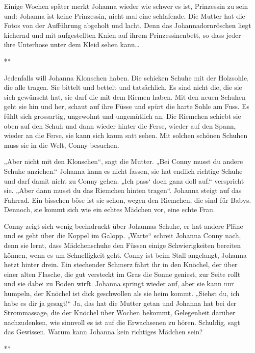 \documentclass[10pt,titlepage,a5paper]{book}
\newcommand{\sterne}{\par{\centering ***\par}}
\begin{document}
Einige Wochen später merkt Johanna wieder wie schwer es ist, Prinzessin zu sein und: Johanna ist keine Prinzessin, nicht mal eine schlafende. Die Mutter hat die Fotos von der Aufführung abgeholt und lacht. Denn das Johannadornröschen liegt kichernd und mit aufgestellten Knien auf ihrem Prinzessinenbett, so dass jeder ihre Unterhose unter dem Kleid sehen kann\dots


\sterne


Jedenfalls will Johanna Klonschen haben. Die schicken Schuhe mit der Holzsohle, die alle tragen. Sie bittelt und bettelt und tatsächlich. Es sind nicht die, die sie sich gewünscht hat, sie darf die mit dem Riemen haben. Mit den neuen Schuhen geht sie hin und her, schaut auf ihre Füsse und spürt die harte Sohle am Fuss. Es fühlt sich grossartig, ungewohnt und ungemütlich an. Die Riemchen schiebt sie oben auf den Schuh und dann wieder hinter die Ferse, wieder auf den Spann, wieder an die Ferse, sie kann sich kaum satt sehen. Mit solchen schönen Schuhen muss sie in die Welt, Conny besuchen.

 „Aber nicht mit den Klonschen“, sagt die Mutter. „Bei Conny musst du andere Schuhe anziehen.“ Johanna kann es nicht fassen, sie hat endlich richtige Schuhe und darf damit nicht zu Conny gehen. „Ich pass` doch ganz doll auf.“ verspricht sie. „Aber dann musst du das Riemchen hinten tragen“. Johanna steigt auf das Fahrrad. Ein bisschen böse ist sie schon, wegen den Riemchen, die sind für Babys.  Dennoch,  sie kommt sich wie ein echtes Mädchen vor, eine echte Frau. 
 
Conny zeigt sich wenig beeindruckt über Johannas Schuhe, er hat andere Pläne und es geht über die Koppel im Galopp. „Warte“ schreit Johanna Conny nach, denn sie lernt, dass  Mädchenschuhe den Füssen einige Schwierigkeiten bereiten können, wenn es um Schnelligkeit geht. Conny ist beim Stall angelangt, Johanna hetzt hinter drein. Ein stechender Schmerz fährt ihr in den Knöchel, der über einer alten Flasche, die gut versteckt im Gras die Sonne geniest, zur Seite rollt und sie dabei zu Boden wirft. Johanna springt wieder auf, aber sie kann nur humpeln, der Knöchel ist dick geschwollen als sie heim kommt. „Siehst du, ich habe es dir ja gesagt!“ Ja, das hat die Mutter getan und Johanna hat bei der Strommassage, die der Knöchel über Wochen bekommt, Gelegenheit da\-rüber nachzudenken, wie sinnvoll es ist auf die Erwachsenen zu hören. Schuldig, sagt das Gewissen. Warum kann Johanna kein richtiges Mädchen sein?


\sterne
\end{document}
